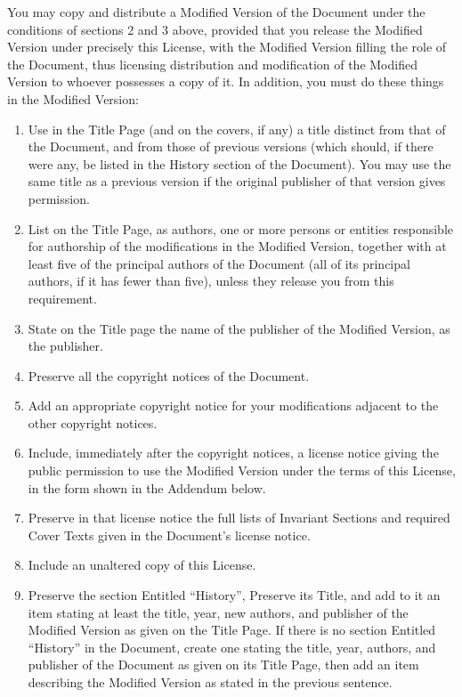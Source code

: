 You may copy and distribute a Modified Version of the Document
under the conditions of sections 2 and 3 above, provided that
you release the Modified Version under precisely this License,
with the Modified Version filling the role of the Document,
thus licensing distribution and modification of the Modified
Version to whoever possesses a copy of it. In addition,
you must do these things in the Modified Version:
\begin{enumerate}
\item    Use in the Title Page (and on the covers, if any)
a title distinct from that of the Document, and from those of
previous versions (which should, if there were any, be listed
in the History section of the Document). You may use the same
title as a previous version if the original publisher of that
version gives permission.

\item    List on the Title Page, as authors, one or more
persons or entities responsible for authorship of the
modifications in the Modified Version, together with at least
five of the principal authors of the Document (all of its
principal authors, if it has fewer than five), unless they
release you from this requirement.

\item    State on the Title page the name of the publisher of the Modified Version, as the publisher.

\item    Preserve all the copyright notices of the Document.

\item    Add an appropriate copyright notice for your
modifications adjacent to the other copyright notices.

\item    Include, immediately after the copyright notices,
a license notice giving the public permission to use the
Modified Version under the terms of this License, in the form
shown in the Addendum below.

\item    Preserve in that license notice the full lists of
Invariant Sections and required Cover Texts given in the
Document’s license notice.

\item    Include an unaltered copy of this License.

\item    Preserve the section Entitled “History”, Preserve
its Title, and add to it an item stating at least the title,
year, new authors, and publisher of the Modified Version
as given on the Title Page. If there is no section Entitled
“History” in the Document, create one stating the title,
year, authors, and publisher of the Document as given on its
Title Page, then add an item describing the Modified Version
as stated in the previous sentence.


\end{enumerate}
